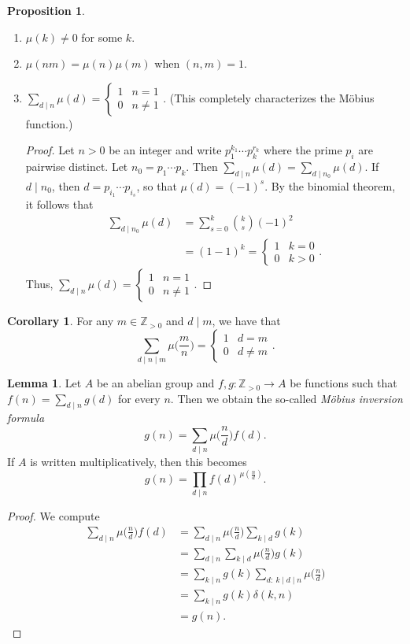 \documentclass[10pt,letterpaper,cm]{nupset}
\theoremstyle{definition}
\newtheorem{prop}{Proposition}
\newtheorem{corollary}{Corollary}
\newtheorem{lemma}{Lemma}
\newcommand{\Z}{\mathbb Z}
\newcommand{\1}{\mathbf{1}}
\newcommand{\0}{\vec 0}
\begin{document}
\begin{prop} $ $
\begin{enumerate}
\item $\mu(k) \ne 0$ for some $k$.
\item $\mu(nm) = \mu(n) \mu(m)$ when $(n,m) = 1$.
\item $\sum_{d\mid n}\mu(d) = \begin{cases} 1 & n=1 \\ 0 & n \ne 1 \end{cases}.$ (This completely characterizes the M\"{o}bius function.)
\begin{proof} Let $n>0$ be an integer and write $p_1^{k_1}\cdots p_k^{r_k}$ where the prime $p_i$ are pairwise distinct. Let $n_0 = p_1\cdots p_k$. Then $\sum_{d\mid n}\mu(d) =\sum_{d\mid n_0} \mu(d)$. If $d\mid n_0$, then $d= p_{i_1}\cdots p_{i_s}$, so that $\mu(d) = ({-}1)^s$. By the binomial theorem, it follows that \begin{align*} \sum_{d\mid n_0}\mu(d) & = \sum_{s=0}^k {k\choose s}({-}1)^2\\ & = (1-1)^k=\begin{cases} 1 & k=0 \\ 0 & k>0 \end{cases}  . \end{align*}
Thus, $\sum_{d\mid n}\mu(d) = \begin{cases} 1 & n=1 \\ 0 & n \ne 1 \end{cases}.$
\end{proof}
\end{enumerate}
\end{prop}

\begin{corollary}
For any $m\in \Z_{>0}$ and $d\mid m$, we have that $$\sum_{d\mid n \mid m}\mu \big (\frac{m}{n} \big ) = \begin{cases}  1 & d = m \\ 0 & d\ne m\end{cases}.$$
\end{corollary}

\begin{lemma}
Let $A$ be an abelian group and $f,g: \Z_{>0}\to A$ be functions such that $f(n) = \sum_{d\mid n}g(d)$ for every $n$. Then we obtain the so-called \textit{M\"{o}bius inversion formula} $$g(n) = \sum_{d\mid n}\mu \big (\frac{n}{d} \big )f(d).$$ If $A$ is written multiplicatively, then this becomes  $$g(n) = \prod_{d\mid n}f(d)^{\mu (\frac{n}{d} )}.$$
\end{lemma}
\begin{proof}
We compute
\begin{align*}
 \sum_{d\mid n}\mu \big (\frac{n}{d} \big )f(d) & = \sum_{d\mid n}\mu \big (\frac{n}{d} \big )\sum_{k\mid d}g(k)
 \\ & = \sum_{d\mid n}\sum_{k\mid d}\mu \big (\frac{n}{d} \big ) g(k)
 \\ & = \sum_{k\mid n}g(k) \sum_{d:\ k\mid d \mid n}\mu \big (\frac{n}{d} \big )
 \\ & = \sum_{k\mid n}g(k) \delta(k,n)
 \\ & = g(n).
\end{align*}
\end{proof}
\end{document}
